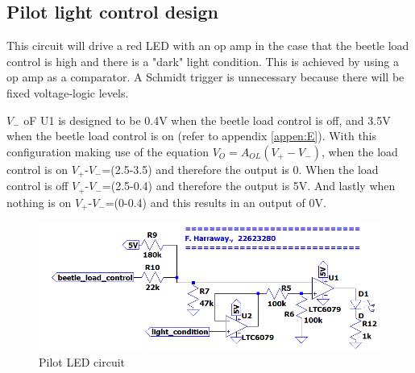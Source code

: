 \subsection{Pilot light control design}

This circuit will drive a red LED with an op amp in the case that the beetle load control is high and there is a "dark" light condition. This is achieved by using a op amp as a comparator. A Schmidt trigger is unnecessary because there will be fixed voltage-logic levels. 

 $V_-$  oF U1 is designed to be 0.4V when the beetle load control is off, and 3.5V when the beetle load control is on (refer to appendix \ref{appen:E}). With this configuration making use of the equation $V_O=A_{OL}(V_+-V_-)$, when the load control is on $V_+$-$V_-$=(2.5-3.5) and therefore the output is 0. When the load control is off  $V_+$-$V_-$=(2.5-0.4) and therefore the output is 5V. And lastly when nothing is on  $V_+$-$V_-$=(0-0.4) and this results in an output of 0V.
\begin{figure}[!htb]
	\centering
	\includegraphics[width=0.55\linewidth]{Figures/A7/pilotLED.png}
	\caption{Pilot LED circuit}
	\label{fig:pilot}
\end{figure}




